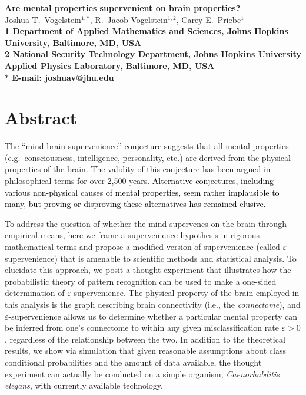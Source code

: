 \documentclass[10pt]{article}
\date{}
\providecommand{\tr}[1]{\textcolor{black}{#1}}
\begin{document}
\begin{flushleft}
{\Large
\textbf{Are mental properties supervenient on brain properties?}
}
\\
Joshua T.~Vogelstein$^{1,\ast}$, 
R.~Jacob Vogelstein$^{1,2}$, 
Carey E.~Priebe$^{1}$
\\
\bf{1} Department of Applied Mathematics and Sciences, Johns Hopkins University, Baltimore, MD, USA
\\
\bf{2} National Security Technology Department, Johns Hopkins University Applied Physics Laboratory, Baltimore, MD, USA
\\
$\ast$ E-mail: joshuav@jhu.edu
\end{flushleft}

\section*{Abstract}

The ``mind-brain supervenience'' \tr{conjecture} suggests that all mental properties (e.g.\ consciousness, intelligence, personality, etc.) are derived from the physical properties of the brain. The validity of this \tr{conjecture} has been argued in philosophical terms for over 2,500 years. \tr{Alternative conjectures, including various non-physical causes of mental properties, seem rather implausible to many, but proving or disproving these alternatives has remained elusive.}  

To address the question of whether the mind supervenes on the brain through empirical means, here we frame a supervenience hypothesis in rigorous mathematical terms and propose a modified version of supervenience (called $\varepsilon$-supervenience) that is amenable to scientific methods and statistical analysis. To elucidate this approach, we posit a thought experiment that illustrates how the probabilistic theory of pattern recognition can be used to make a one-sided determination of $\varepsilon$-supervenience. The physical property of the brain employed in this analysis is the graph describing brain connectivity (i.e., the \emph{connectome}), and $\varepsilon$-supervenience allows us to determine whether a particular mental property can be inferred from one's connectome to within any given misclassification rate $\varepsilon > 0$, regardless of the relationship between the two. In addition to the theoretical results, we show via simulation that given reasonable assumptions about class conditional probabilities and the amount of data available, the thought experiment can actually be conducted on a simple organism, \emph{Caenorhabditis elegans}, with currently available technology.
\end{document}
